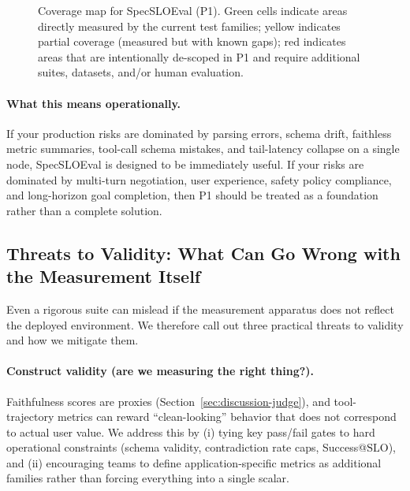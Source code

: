 \documentclass[11pt]{article}
\newcommand{\slo}{\ensuremath{\mathrm{SLO}}}
\begin{document}
\begin{figure}[t]
    \caption{Coverage map for SpecSLOEval (P1). Green cells indicate areas directly measured by the current test families; yellow indicates partial coverage (measured but with known gaps); red indicates areas that are intentionally de-scoped in P1 and require additional suites, datasets, and/or human evaluation.}
    \label{fig:coverage-map}
\end{figure}

\paragraph{What this means operationally.}
If your production risks are dominated by parsing errors, schema drift, faithless metric summaries, tool-call schema mistakes, and tail-latency collapse on a single node, SpecSLOEval is designed to be immediately useful.
If your risks are dominated by multi-turn negotiation, user experience, safety policy compliance, and long-horizon goal completion, then P1 should be treated as a foundation rather than a complete solution.

\subsection{Threats to Validity: What Can Go Wrong with the Measurement Itself}

Even a rigorous suite can mislead if the measurement apparatus does not reflect the deployed environment.
We therefore call out three practical threats to validity and how we mitigate them.

\paragraph{Construct validity (are we measuring the right thing?).}
Faithfulness scores are proxies (Section~\ref{sec:discussion-judge}), and tool-trajectory metrics can reward ``clean-looking'' behavior that does not correspond to actual user value.
We address this by (i) tying key pass/fail gates to hard operational constraints (schema validity, contradiction rate caps, Success@\slo), and (ii) encouraging teams to define application-specific metrics as additional families rather than forcing everything into a single scalar.
\end{document}
